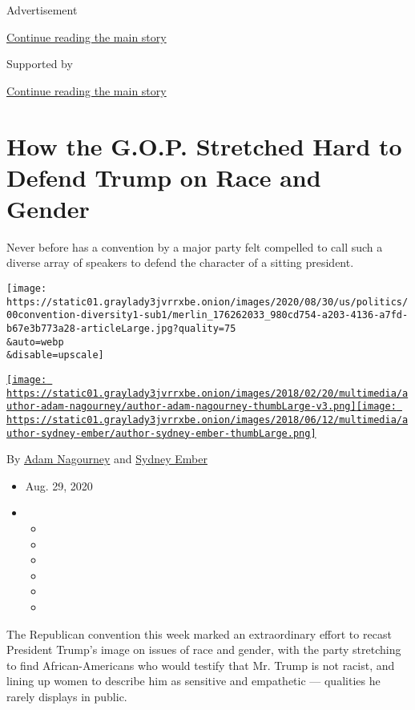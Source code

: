 Advertisement

\protect\hyperlink{after-top}{Continue reading the main story}

Supported by

\protect\hyperlink{after-sponsor}{Continue reading the main story}

\hypertarget{how-the-gop-stretched-hard-to-defend-trump-on-race-and-gender}{%
\section{How the G.O.P. Stretched Hard to Defend Trump on Race and
Gender}\label{how-the-gop-stretched-hard-to-defend-trump-on-race-and-gender}}

Never before has a convention by a major party felt compelled to call
such a diverse array of speakers to defend the character of a sitting
president.

\texttt{[image: https://static01.graylady3jvrrxbe.onion/images/2020/08/30/us/politics/00convention-diversity1-sub1/merlin\_176262033\_980cd754-a203-4136-a7fd-b67e3b773a28-articleLarge.jpg?quality=75\\\&auto=webp\\\&disable=upscale]}

\href{https://www.nytimes3xbfgragh.onion/by/adam-nagourney}{\texttt{[image: https://static01.graylady3jvrrxbe.onion/images/2018/02/20/multimedia/author-adam-nagourney/author-adam-nagourney-thumbLarge-v3.png]}}\href{https://www.nytimes3xbfgragh.onion/by/sydney-ember}{\texttt{[image: https://static01.graylady3jvrrxbe.onion/images/2018/06/12/multimedia/author-sydney-ember/author-sydney-ember-thumbLarge.png]}}

By \href{https://www.nytimes3xbfgragh.onion/by/adam-nagourney}{Adam
Nagourney} and
\href{https://www.nytimes3xbfgragh.onion/by/sydney-ember}{Sydney Ember}

\begin{itemize}
\item
  Aug. 29, 2020
\item
  \begin{itemize}
  \item
  \item
  \item
  \item
  \item
  \item
  \end{itemize}
\end{itemize}

The Republican convention this week marked an extraordinary effort to
recast President Trump's image on issues of race and gender, with the
party stretching to find African-Americans who would testify that Mr.
Trump is not racist, and lining up women to describe him as sensitive
and empathetic --- qualities he rarely displays in public.

